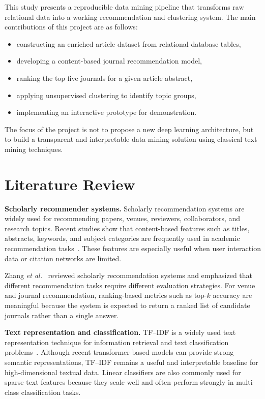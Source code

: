 \documentclass[conference]{IEEEtran}
\begin{document}
This study presents a reproducible data mining pipeline that transforms raw relational data into a working recommendation and clustering system. The main contributions of this project are as follows:

\begin{itemize}
    \item constructing an enriched article dataset from relational database tables,
    \item developing a content-based journal recommendation model,
    \item ranking the top five journals for a given article abstract,
    \item applying unsupervised clustering to identify topic groups,
    \item implementing an interactive prototype for demonstration.
\end{itemize}

The focus of the project is not to propose a new deep learning architecture, but to build a transparent and interpretable data mining solution using classical text mining techniques.

\section{Literature Review}
\textbf{Scholarly recommender systems.}
Scholarly recommendation systems are widely used for recommending papers, venues, reviewers, collaborators, and research topics. Recent studies show that content-based features such as titles, abstracts, keywords, and subject categories are frequently used in academic recommendation tasks~\cite{khadka2025,mumtaz2022}. These features are especially useful when user interaction data or citation networks are limited.

Zhang \emph{et al.}~\cite{zhang2023} reviewed scholarly recommendation systems and emphasized that different recommendation tasks require different evaluation strategies. For venue and journal recommendation, ranking-based metrics such as top-$k$ accuracy are meaningful because the system is expected to return a ranked list of candidate journals rather than a single answer.

\textbf{Text representation and classification.}
TF--IDF is a widely used text representation technique for information retrieval and text classification problems~\cite{manning2008}. Although recent transformer-based models can provide strong semantic representations, TF--IDF remains a useful and interpretable baseline for high-dimensional textual data. Linear classifiers are also commonly used for sparse text features because they scale well and often perform strongly in multi-class classification tasks.
\end{document}
